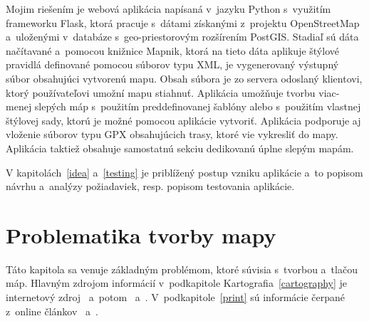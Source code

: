 Mojim riešením je webová aplikácia napísaná v~jazyku Python s~využitím frameworku Flask, ktorá pracuje s~dátami získanými z~projektu OpenStreetMap a~uloženými v~databáze s~geo-priestorovým rozšírením PostGIS. Stadiaľ sú dáta načítavané a~pomocou knižnice Mapnik, ktorá na tieto dáta aplikuje štýlové pravidlá definované pomocou súborov typu XML, je vygenerovaný výstupný súbor obsahujúci vytvorenú mapu. Obsah súbora je zo servera odoslaný klientovi, ktorý používateľovi umožní mapu stiahnuť. Aplikácia umožňuje tvorbu viac-menej slepých máp s~použitím preddefinovanej šablóny alebo s~použitím vlastnej štýlovej sady, ktorú je možné pomocou aplikácie vytvoriť. Aplikácia podporuje aj vloženie súborov typu GPX obsahujúcich trasy, ktoré vie vykresliť do mapy. Aplikácia taktiež obsahuje samostatnú sekciu dedikovanú úplne slepým mapám.

V kapitolách~\ref{idea} a~\ref{testing} je priblížený postup vzniku aplikácie a~to popisom návrhu a~analýzy požiadaviek, resp. popisom testovania aplikácie.  



\chapter{Problematika tvorby mapy}
\label{theory}
Táto kapitola sa venuje základným problémom, ktoré súvisia s~tvorbou a~tlačou máp. Hlavným zdrojom informácií v~podkapitole Kartografia~\ref{cartography} je internetový zdroj~\cite{cartography_3} a~potom~\cite{cartography_1} a~\cite{cartography_2}. V~podkapitole~\ref{print} sú informácie čerpané z~online článkov~\cite{printing_1} a~\cite{printing_2}.


